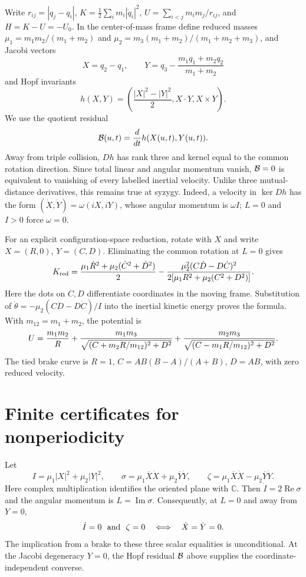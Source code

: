 Write $r_{ij}=|q_j-q_i|$, $K=\tfrac12\sum_i m_i|\dot q_i|^2$,
$U=\sum_{i<j}m_im_j/r_{ij}$, and $H=K-U=-U_0$. In the center-of-mass
frame define reduced masses $\mu_1=m_1m_2/(m_1+m_2)$ and
$\mu_2=m_3(m_1+m_2)/(m_1+m_2+m_3)$, and Jacobi vectors
\[
X=q_2-q_1,\qquad
Y=q_3-\frac{m_1q_1+m_2q_2}{m_1+m_2}
\]
and Hopf invariants
\[
h(X,Y)=\left(\frac{|X|^2-|Y|^2}{2},X\cdot Y,X\times Y\right).
\]
We use the quotient residual
\[
\mathcal B(u,t)=\frac{d}{dt}h(X(u,t),Y(u,t)).
\]
Away from triple collision, $Dh$ has rank three and kernel equal to the common
rotation direction.  Since total linear and angular momentum vanish,
$\mathcal B=0$ is equivalent to vanishing of every labelled inertial velocity.
Unlike three mutual-distance derivatives, this remains true at syzygy.
Indeed, a velocity in $\ker Dh$ has the form
$(\dot X,\dot Y)=\omega(iX,iY)$, whose angular momentum is $\omega I$;
$L=0$ and $I>0$ force $\omega=0$.

For an explicit configuration-space reduction, rotate with $X$ and write
$X=(R,0)$, $Y=(C,D)$. Eliminating the common rotation at $L=0$ gives
\[
 K_{\rm red}={\mu_1\dot R^2+\mu_2(\dot C^2+\dot D^2)\over2}
 -{\mu_2^2(C\dot D-D\dot C)^2\over
 2[\mu_1R^2+\mu_2(C^2+D^2)]}.
\]
Here the dots on $C,D$ differentiate coordinates in the moving frame.
Substitution of
$\dot\theta=-\mu_2(C\dot D-D\dot C)/I$ into the inertial kinetic
energy proves the formula. With $m_{12}=m_1+m_2$, the potential is
\[
 U={m_1m_2\over R}
 +{m_1m_3\over\sqrt{(C+m_2R/m_{12})^2+D^2}}
 +{m_2m_3\over\sqrt{(C-m_1R/m_{12})^2+D^2}}.
\]
The tied brake curve is
$R=1$, $C=AB(B-A)/(A+B)$, $D=AB$, with zero reduced velocity.

\section{Finite certificates for nonperiodicity}\label{sec:events}

Let
\[
 I=\mu_1|X|^2+\mu_2|Y|^2,\qquad
 \sigma=\mu_1\overline X\dot X+\mu_2\overline Y\dot Y,
 \qquad
 \zeta=\mu_1\overline X\dot X-\mu_2\overline Y\dot Y .
\]
Here complex multiplication identifies the oriented plane with $\mathbb C$.
Then $\dot I=2\operatorname{Re}\sigma$ and the angular momentum is
$L=\operatorname{Im}\sigma$.  Consequently, at $L=0$ and away from $Y=0$,
\[
 \dot I=0\ \hbox{ and }\ \zeta=0
 \quad\Longleftrightarrow\quad
 \dot X=\dot Y=0.
\]
The implication from a brake to these three scalar equalities is
unconditional.  At the Jacobi degeneracy $Y=0$, the Hopf residual $\mathcal B$
above supplies the coordinate-independent converse.

